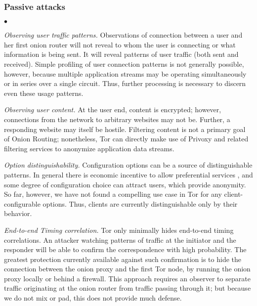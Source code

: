 \documentclass[times,10pt,twocolumn]{article}
\newenvironment{tightlist}{\begin{list}{$\bullet$}{
  \setlength{\itemsep}{0mm}
    \setlength{\parsep}{0mm}
    }}{\end{list}}
\begin{document}
\subsubsection*{Passive attacks}
\begin{tightlist}
\item \emph{Observing user traffic patterns.} Observations of connection
  between a user and her first onion router will not reveal to whom
  the user is connecting or what information is being sent. It will
  reveal patterns of user traffic (both sent and received). Simple
  profiling of user connection patterns is not generally possible,
  however, because multiple application streams may be operating
  simultaneously or in series over a single circuit. Thus, further
  processing is necessary to discern even these usage patterns.
  
\item \emph{Observing user content.} At the user end, content is
  encrypted; however, connections from the network to arbitrary
  websites may not be. Further, a responding website may itself be
  hostile. Filtering content is not a primary goal of
  Onion Routing; nonetheless, Tor can directly make use of Privoxy and
  related filtering services to anonymize application data streams.

\item \emph{Option distinguishability.} Configuration options can be a
  source of distinguishable patterns. In general there is economic
  incentive to allow preferential services \cite{econymics}, and some
  degree of configuration choice can attract users, which
  provide anonymity.  So far, however, we have
  not found a compelling use case in Tor for any client-configurable
  options.  Thus, clients are currently distinguishable only by their
  behavior.
  
\item \emph{End-to-end Timing correlation.}  Tor only minimally hides
  end-to-end timing correlations. An attacker watching patterns of
  traffic at the initiator and the responder will be
  able to confirm the correspondence with high probability. The
  greatest protection currently available against such confirmation is to hide
  the connection between the onion proxy and the first Tor node,
  by running the onion proxy locally or 
  behind a firewall.  This approach
  requires an observer to separate traffic originating at the onion
  router from traffic passing through it; but because we do not mix
  or pad, this does not provide much defense.
  

\end{tightlist}
\end{document}
